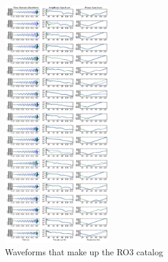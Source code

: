 \documentclass[%
 reprint,
 amsmath,amssymb,
 aps,
]{revtex4-1}
\begin{document}
\begin{figure}
\centering
\includegraphics[width=0.4\textwidth]{figures/RO3-series_catalogue.png}
\caption{Waveforms that make up the RO3 catalog}
\label{fig:RO3_catalog}
\end{figure}
\end{document}
